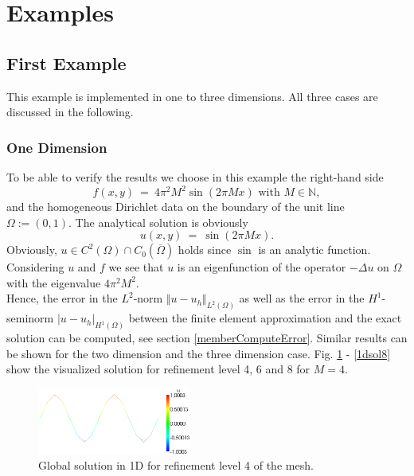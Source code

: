 \documentclass[a4paper, 11pt, twoside]{article}
\begin{document}
\section{Examples}\label{sectionExample}
\subsection{First Example}\label{sectionfirstexample}

This example is implemented in one to three dimensions. All three cases are discussed in the following.
\subsubsection{One Dimension}\label{sectiononedimension}
To be able to verify the results  we choose in this example the right-hand side 
\begin{equation}
f(x,y)\ =\ 4 \pi^2 M^2 \sin(2 \pi M x )  \text{ with } M\in \mathbb{N}, 
\end{equation}
and the homogeneous Dirichlet data on the boundary of the unit line $\Omega:=(0,1)$. The analytical solution is obviously
\begin{equation}\label{exactSolution}
u(x,y)\ =\ \sin(2 \pi M x ).  
\end{equation}
Obviously, $u \in C^2(\Omega) \cap C_0(\overline{\Omega})$ holds since $\sin$ is an analytic function.
Considering $u$ and $f$ we see that $u$ is an eigenfunction of the operator $- \Delta u$ on $\Omega$ with the eigenvalue $4 \pi^2 M^2$. \\
Hence, the error in the $L^2$-norm $\Vert u-u_h \Vert_{L^2(\Omega)}$ as well as the error in the $H^1$-seminorm $\vert u-u_h \vert_{H^1(\Omega)}$ between the finite element approximation and the exact solution
can be computed, see section \ref{memberComputeError}. Similar results can be shown for the two dimension and the three dimension case.
Fig. \ref{1dsol4} - \ref{1dsol8} show the visualized solution for refinement level 4, 6 and 8 for $M=4$.


\begin{figure}[h!]
	\centering
		\includegraphics[width=0.45\textwidth]{fig/u_poisson_tut_1d_lvl4_M2_trans.png}
\caption{Global solution in 1D for refinement level 4 of the mesh.}
\label{1dsol4}
\end{figure}
\end{document}
